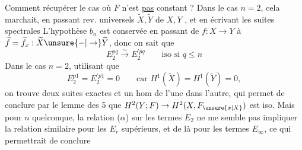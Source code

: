  Comment récupérer le cas où $F$ n'est \uline{pas} constant ? Dans le cas $n=2$, cela marchait,  en passant  rev. universels $\widetilde X,\widetilde Y$ de $X,Y$ , et en écrivant les suites spectrales
L'hypothèse $b_n$ est conservée en passant de $f:X\to Y$ à $\widetilde f=\widetilde f_x:\widetilde X\unsure{-|\to}\widetilde Y$, donc on sait que
\[
E_2^{pq}\xrightarrow{\sim}E^{\prime pq}_2\qquad\text{iso si }q\leq n
\tag*{($\alpha$)}
\]
Dans le cas $n=2$, utilisant que
\[
E_2^{p1}=E^{\prime p1}_2=0\qquad\text{car }H^1(\widetilde X)=H^1(\widetilde Y)=0,
\]
on trouve deux suites exactes
et un hom de l'une dans l'autre, qui permet de conclure par le lemme des 5 que $H^2(Y;F)\to H^2(X,F_{\unsure{x|X}})$ est iso.
Mais pour $n$ quelconque, la relation ($\alpha$) sur les termes $E_2$  ne me semble pas impliquer la relation similaire pour les $E_r$ supérieurs, et de là pour les termes $E_\infty$, ce qui permettrait de conclure

